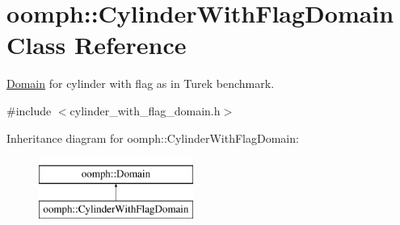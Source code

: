 \hypertarget{classoomph_1_1CylinderWithFlagDomain}{}\section{oomph\+:\+:Cylinder\+With\+Flag\+Domain Class Reference}
\label{classoomph_1_1CylinderWithFlagDomain}


\hyperlink{classoomph_1_1Domain}{Domain} for cylinder with flag as in Turek benchmark.  




{\ttfamily \#include $<$cylinder\+\_\+with\+\_\+flag\+\_\+domain.\+h$>$}

Inheritance diagram for oomph\+:\+:Cylinder\+With\+Flag\+Domain\+:\begin{figure}[H]
\begin{center}
\leavevmode
\includegraphics[height=2.000000cm]{classoomph_1_1CylinderWithFlagDomain}
\end{center}
\end{figure}
